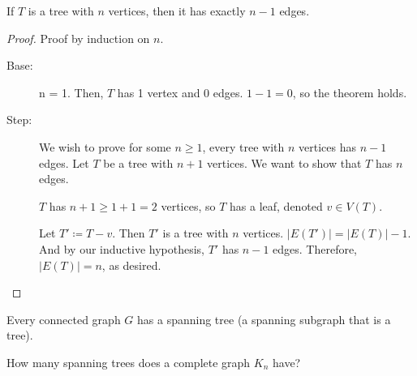 \begin{theorem}
	If \( T \) is a tree with \( n \) vertices, then it has exactly \( n-1 \) edges.
\end{theorem}
\begin{proof}
	Proof by induction on \( n \). \par
	\begin{description}
		\item[Base:]  n = 1. Then, \( T \) has 1 vertex and 0 edges. \( 1 - 1 = 0 \), so the theorem holds.
		\item[Step:] We wish to prove for some \( n \ge 1 \), every tree with \( n \) vertices has \( n - 1 \) edges. Let \( T \) be a tree with \( n + 1 \) vertices. We want to show that \( T \) has \( n \) edges.
			\begin{note}
				\( T \) has \( n + 1 \ge 1 + 1 = 2 \) vertices, so \( T \) has a leaf, denoted \( v \in  V(T) \).
			\end{note}
			Let \( T' \coloneqq T - v \). Then \( T' \) is a tree with \( n \) vertices. \( |E(T')| = |E(T)| - 1 \). And by our inductive hypothesis, \( T' \) has \( n - 1 \) edges. Therefore, \( |E(T)| = n \), as desired.
	\end{description}
\end{proof}

\begin{property}
	Every connected graph \( G \) has a spanning tree (a spanning subgraph that is a tree).
\end{property}
How many spanning trees does a complete graph \( K_n \) have?
